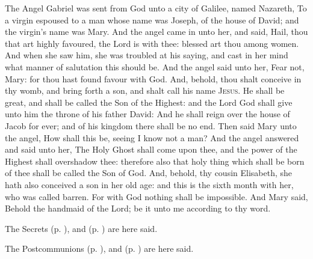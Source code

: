  The Angel Gabriel was sent from God unto a city of Galilee, named Nazareth, To a virgin espoused to a man whose name was Joseph, of the house of David; and the virgin's name was Mary. And the angel came in unto her, and said, Hail, thou that art highly favoured, the Lord is with thee: blessed art thou among women. And when she saw him, she was troubled at his saying, and cast in her mind what manner of salutation this should be. And the angel said unto her, Fear not, Mary: for thou hast found favour with God. And, behold, thou shalt conceive in thy womb, and bring forth a son, and shalt call his name {\textsc{Jesus}}. He shall be great, and shall be called the Son of the Highest: and the Lord God shall give unto him the throne of his father David: And he shall reign over the house of Jacob for ever; and of his kingdom there shall be no end. Then said Mary unto the angel, How shall this be, seeing I know not a man? And the angel answered and said unto her, The Holy Ghost shall come upon thee, and the power of the Highest shall overshadow thee: therefore also that holy thing which shall be born of thee shall be called the Son of God. And, behold, thy cousin Elisabeth, she hath also conceived a son in her old age: and this is the sixth month with her, who was called barren. For with God nothing shall be impossible. And Mary said, Behold the handmaid of the Lord; be it unto me according to thy word.
\begin{rubric}
    The Secrets  (p. \pageref{SPMaryInAdvent}),  and  (p. \pageref{SPHolyGhost}) are here said.
\end{rubric}

\begin{rubric}
    The Postcommunions  (p. \pageref{SPMaryInAdvent}),  and  (p. \pageref{SPHolyGhost}) are here said.
\end{rubric}

